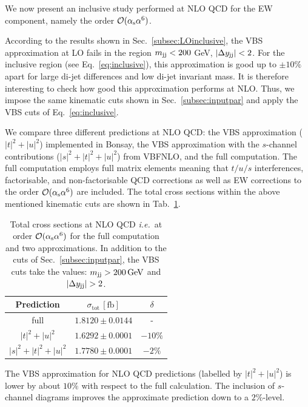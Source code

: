 We now present an inclusive study performed at NLO QCD for the EW component, namely the order $\mathcal{O}(\alpha_\text{s}\alpha^6)$.

According to the results shown in Sec.~\ref{subsec:LOinclusive}, the VBS approximation at LO fails in the region $m_{\text{j}\text{j}} < 200$ GeV, $|\Delta y_{\text{j}\text{j}}| < 2$.
For the inclusive region (see Eq.~\eqref{eq:inclusive}), this approximation is good up to $\pm10\%$ apart for large di-jet differences and low di-jet invariant mass.
It is therefore interesting to check how good this approximation performs at NLO.
Thus, we impose the same kinematic cuts shown in Sec.~\ref{subsec:inputpar} and apply the VBS cuts of Eq.~\eqref{eq:inclusive}.

We compare three different predictions at NLO QCD: 
the VBS approximation ($|t|^2+|u|^2$) implemented in {\sc Bonsay}, the VBS approximation with the $s$-channel contributions ($|s|^2+|t|^2+|u|^2$) from {\sc VBFNLO}, and the full computation.
The full computation employs full matrix elements meaning that $t/u/s$ interferences, factorisable, and non-factorisable QCD corrections as well as EW corrections to the order $\mathcal{O}(\alpha_\text{s} \alpha^6)$ are included.
The total cross sections within the above mentioned kinematic cuts are shown in Tab.~\ref{tab:crosssecINCLUSIVE}.

\begin{table}[h!]
\centering
\begin{tabular}{c|c|c}
Prediction & $\sigma_{\textrm{tot}}\,[\textrm{fb}]$ & $\delta$ \\
\hline
\hline
full &  $1.8120 \pm 0.0144$ & - \\
\hline
$|t|^2 + |u|^2$ & $1.6292 \pm 0.0001$  &  $-10\%$ \\
\hline
$|s|^2 + |t|^2 + |u|^2$ & $1.7780 \pm 0.0001$  & $-2\%$
\end{tabular}
\caption{
Total cross sections at NLO QCD \emph{i.e.}\ at order $\mathcal{O}(\alpha_\text{s}\alpha^6)$ for the full computation and two approximations.
In addition to the cuts of Sec.~\ref{subsec:inputpar}, the VBS cuts take the values: $m_{\text{j}\text{j}}>200 \,\text{GeV}$ and $|\Delta y_{\Pj\Pj}|>2$.}
\label{tab:crosssecINCLUSIVE}
\end{table}

The VBS approximation for NLO QCD predictions (labelled by $|t|^2 + |u|^2$) is lower by about $10\%$ with respect to the full calculation.
The inclusion of $s$-channel diagrams improves the approximate prediction down to a $2\%$-level.

